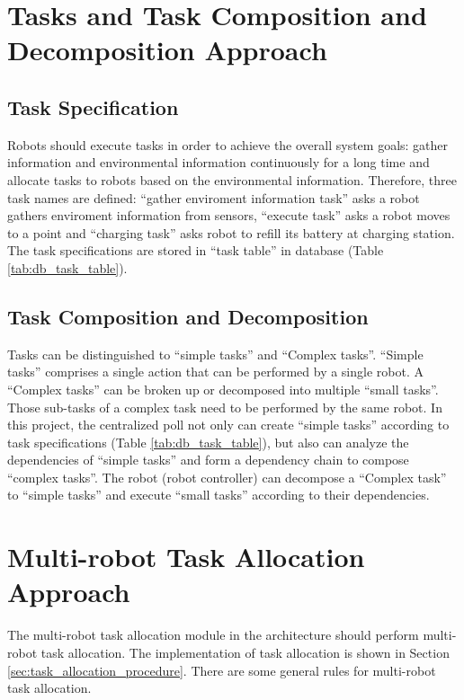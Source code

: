 
\section{Tasks and Task Composition and Decomposition Approach}

\subsection{Task Specification}
Robots should execute tasks in order to achieve the overall system goals: gather information and environmental information continuously for a long time and allocate tasks to robots based on the environmental information.  Therefore, three task names are defined: ``gather enviroment information task'' asks a robot gathers enviroment information from sensors, ``execute task'' asks a robot moves to a point and  ``charging task'' asks robot to refill its battery at charging station.
The task specifications are stored in ``task table'' in database (Table \ref{tab:db_task_table}).


\subsection{Task Composition and Decomposition}
Tasks can be distinguished to ``simple tasks'' and ``Complex tasks''.  ``Simple tasks'' comprises a single action that can be performed by a single robot. A ``Complex tasks'' can be broken up or decomposed into multiple ``small tasks''. Those sub-tasks of a complex task need to be performed by the same robot.
In this project, the centralized poll not only can create ``simple tasks'' according to task specifications (Table \ref{tab:db_task_table}), but also can analyze the dependencies of ``simple tasks'' and form a dependency chain to compose ``complex tasks''. The robot (robot controller) can decompose a ``Complex task'' to ``simple tasks'' and execute ``small tasks'' according to their dependencies.

\section{Multi-robot Task Allocation Approach}
The multi-robot task allocation module in the architecture should perform multi-robot task allocation. 
The implementation of task allocation is shown in Section \ref{sec:task_allocation_procedure}. There are some general rules for multi-robot task allocation.


